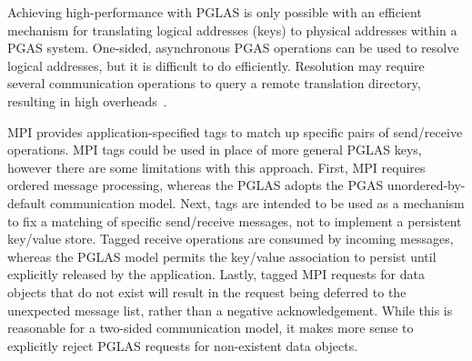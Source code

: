 

Achieving high-performance with PGLAS is only possible with an efficient
mechanism for translating logical addresses (keys) to physical addresses within
a PGAS system. One-sided, asynchronous PGAS operations can be used to resolve
logical addresses, but it is difficult to do efficiently. Resolution may
require several communication operations to query a remote translation 
directory, resulting in high overheads~\cite{namashivayam:15}.

MPI provides application-specified tags to match up specific pairs of 
send/receive operations. MPI tags could be used in place of more general PGLAS 
keys, however there are some limitations with this approach. First, MPI 
requires ordered message processing, whereas the PGLAS adopts the
PGAS unordered-by-default communication model. Next, tags are intended to be 
used as a mechanism to fix a matching of specific send/receive messages, not to 
implement a persistent key/value store. Tagged receive operations are consumed 
by incoming messages, whereas the PGLAS model permits the key/value association
to persist until explicitly released by the application. Lastly, tagged MPI 
requests for data objects that do not exist will result in the request being 
deferred to the unexpected message list, rather than a negative 
acknowledgement. While this is reasonable for a two-sided communication model, 
it makes more sense to explicitly reject PGLAS requests for non-existent data 
objects.

